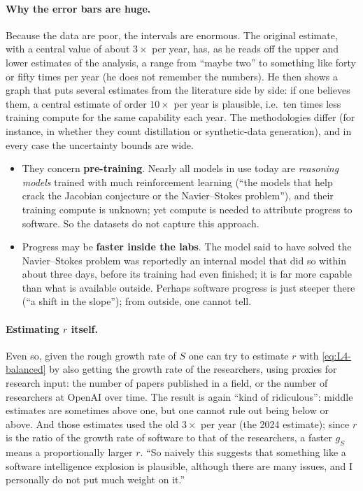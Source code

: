 \paragraph{Why the error bars are huge.}
Because the data are poor, the intervals are enormous. The original estimate, with a central value of about $3\times$ per year, has, as he reads off the upper and lower estimates of the analysis, a range from ``maybe two'' to something like forty or fifty times per year (he does not remember the numbers)\flag. He then shows a graph that puts several estimates from the literature side by side: if one believes them, a central estimate of order $10\times$ per year is plausible, i.e.\ ten times less training compute for the same capability each year. The methodologies differ (for instance, in whether they count distillation or synthetic-data generation), and in every case the uncertainty bounds are wide.

\begin{caution}
\begin{itemize}
  \item They concern \textbf{pre-training}. Nearly all models in use today are \emph{reasoning models} trained with much reinforcement learning (``the models that help crack the Jacobian conjecture or the Navier--Stokes problem''), and their training compute is unknown; yet compute is needed to attribute progress to software. So the datasets do not capture this approach.
  \item Progress may be \textbf{faster inside the labs}. The model said to have solved the Navier--Stokes problem was reportedly an internal model that did so within about three days, before its training had even finished\flag; it is far more capable than what is available outside. Perhaps software progress is just steeper there (``a shift in the slope''); from outside, one cannot tell.
\end{itemize}
\end{caution}

\paragraph{Estimating $r$ itself.}
Even so, given the rough growth rate of $S$ one can try to estimate $r$ with \eqref{eq:L4-balanced} by also getting the growth rate of the researchers, using proxies for research input: the number of papers published in a field, or the number of researchers at OpenAI over time. The result is again ``kind of ridiculous'': middle estimates are sometimes above one, but one cannot rule out being below or above. And those estimates used the old $3\times$ per year (the 2024 estimate); since $r$ is the ratio of the growth rate of software to that of the researchers, a faster $g_S$ means a proportionally larger $r$. ``So naively this suggests that something like a software intelligence explosion is plausible, although there are many issues, and I personally do not put much weight on it.''

